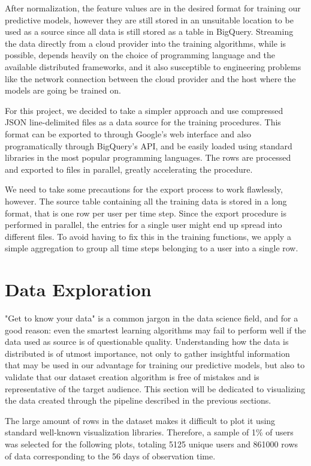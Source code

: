\documentclass{kththesis}
\begin{document}
After normalization, the feature values are in the desired format for training our predictive models, however they are still stored in an unsuitable location to be used as a source since all data is still stored as a table in BigQuery. Streaming the data directly from a cloud provider into the training algorithms, while is possible, depends heavily on the choice of programming language and the available distributed frameworks, and it also susceptible to engineering problems like the network connection between the cloud provider and the host where the models are going be trained on.

For this project, we decided to take a simpler approach and use compressed JSON line-delimited files as a data source for the training procedures. This format can be exported to through Google's web interface and also programatically through BigQuery's API, and be easily loaded using standard libraries in the most popular programming languages. The rows are processed and exported to files in parallel, greatly accelerating the procedure.

We need to take some precautions for the export process to work flawlessly, however. The source table containing all the training data is stored in a long format, that is one row per user per time step. Since the export procedure is performed in parallel, the entries for a single user might end up spread into different files. To avoid having to fix this in the training functions, we apply a simple aggregation to group all time steps belonging to a user into a single row.

\section{Data Exploration}

"Get to know your data" is a common jargon in the data science field, and for a good reason: even the smartest learning algorithms may fail to perform well if the data used as source is of questionable quality. Understanding how the data is distributed is of utmost importance, not only to gather insightful information that may be used in our advantage for training our predictive models, but also to validate that our dataset creation algorithm is free of mistakes and is representative of the target audience. This section will be dedicated to visualizing the data created through the pipeline described in the previous sections.

The large amount of rows in the dataset makes it difficult to plot it using standard well-known visualization libraries. Therefore, a sample of 1\% of users was selected for the following plots, totaling 5125 unique users and 861000 rows of data corresponding to the 56 days of observation time.
\end{document}
